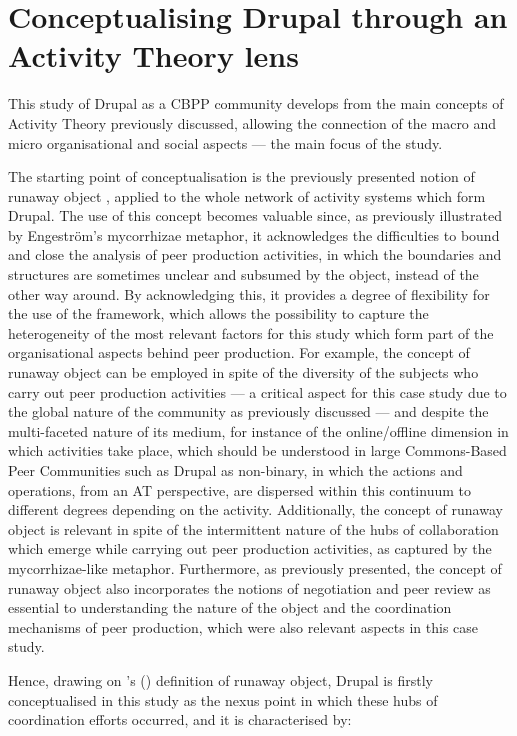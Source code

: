 \section{Conceptualising Drupal through an Activity Theory lens}
\label{subsec:at-conceptualisation}

This study of Drupal as a CBPP community develops from the main concepts of Activity Theory previously discussed, allowing the connection of the macro and micro organisational and social aspects --- the main focus of the study.

The starting point of conceptualisation is the previously presented notion of runaway object \parencite{engestrom_future_2009}, applied to the whole network of activity systems which form Drupal. The use of this concept becomes valuable since, as previously illustrated by Engestr{\"o}m's mycorrhizae metaphor, it acknowledges the difficulties to bound and close the analysis of peer production activities, in which the boundaries and structures are sometimes unclear and subsumed by the object, instead of the other way around. By acknowledging this, it provides a degree of flexibility for the use of the framework, which allows the possibility to capture the heterogeneity of the most relevant factors for this study which form part of the organisational aspects behind peer production. For example, the concept of runaway object can be employed in spite of the diversity of the subjects who carry out peer production activities --- a critical aspect for this case study due to the global nature of the community as previously discussed --- and despite the multi-faceted nature of its medium, for instance of the online\slash offline dimension in which activities take place, which should be understood in large Commons-Based Peer Communities such as Drupal as non-binary, in which the actions and operations, from an AT perspective, are dispersed within this continuum to different degrees depending on the activity. Additionally, the concept of runaway object is relevant in spite of the intermittent nature of the hubs of collaboration which emerge while carrying out peer production activities, as captured by the mycorrhizae-like metaphor. Furthermore, as previously presented, the concept of runaway object also incorporates the notions of negotiation and peer review as essential to understanding the nature of the object and the coordination mechanisms of peer production, which were also relevant aspects in this case study.

Hence, drawing on \citeauthor{engestrom_future_2009}'s (\citeyear{engestrom_future_2009}) definition of runaway object, Drupal is firstly conceptualised in this study as the nexus point in which these hubs of coordination efforts occurred, and it is characterised by:

